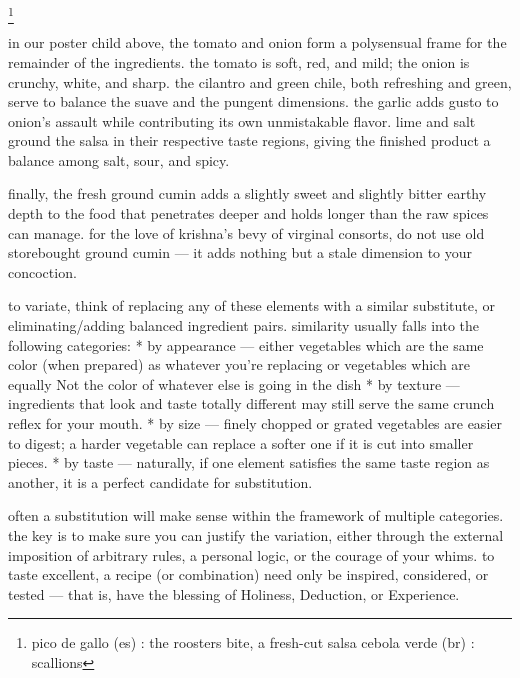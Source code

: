 \footnote{pico de gallo (es) : the roosters bite, a fresh-cut salsa
cebola verde (br) : scallions}

in our poster child above, the tomato and onion form a polysensual frame for the remainder of the ingredients. the tomato is soft, red, and mild; the onion is crunchy, white, and sharp. the cilantro and green chile, both refreshing and green, serve to balance the suave and the pungent dimensions. the garlic adds gusto to onion's assault while contributing its own unmistakable flavor. lime and salt ground the salsa in their respective taste regions, giving the finished product a balance among salt, sour, and spicy.

finally, the fresh ground cumin adds a slightly sweet and slightly bitter earthy depth to the food that penetrates deeper and holds longer than the raw spices can manage. for the love of krishna's bevy of virginal consorts, do not use old storebought ground cumin --- it adds nothing but a stale dimension to your concoction.

to variate, think of replacing any of these elements with a similar substitute, or eliminating/adding balanced ingredient pairs. similarity usually falls into the following categories:
	* by appearance --- either vegetables which are the same color (when prepared) as whatever you're replacing or vegetables which are equally Not the color of whatever else is going in the dish
	* by texture --- ingredients that look and taste totally different may still serve the same crunch reflex for your mouth.
	* by size --- finely chopped or grated vegetables are easier to digest; a harder vegetable can replace a softer one if it is cut into smaller pieces.
	* by taste --- naturally, if one element satisfies the same taste region as another, it is a perfect candidate for substitution.

often a substitution will make sense within the framework of multiple categories. the key is to make sure you can justify the variation, either through the external imposition of arbitrary rules, a personal logic, or the courage of your whims. to taste excellent, a recipe (or combination) need only be inspired, considered, or tested --- that is, have the blessing of Holiness, Deduction, or Experience.


